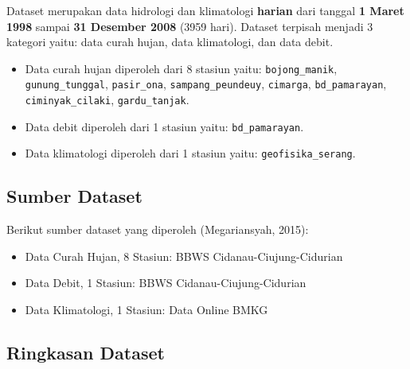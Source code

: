 \documentclass[11pt]{article}
\providecommand{\tightlist}{%
      \setlength{\itemsep}{0pt}\setlength{\parskip}{0pt}}
\begin{document}
Dataset merupakan data hidrologi dan klimatologi \textbf{harian} dari
tanggal \textbf{1 Maret 1998} sampai \textbf{31 Desember 2008} (3959
hari). Dataset terpisah menjadi 3 kategori yaitu: data curah hujan, data
klimatologi, dan data debit.

\begin{itemize}
\tightlist
\item
  Data curah hujan diperoleh dari 8 stasiun yaitu:
  \texttt{bojong\_manik}, \texttt{gunung\_tunggal}, \texttt{pasir\_ona},
  \texttt{sampang\_peundeuy}, \texttt{cimarga}, \texttt{bd\_pamarayan},
  \texttt{ciminyak\_cilaki}, \texttt{gardu\_tanjak}.
\item
  Data debit diperoleh dari 1 stasiun yaitu: \texttt{bd\_pamarayan}.
\item
  Data klimatologi diperoleh dari 1 stasiun yaitu:
  \texttt{geofisika\_serang}.
\end{itemize}

    \hypertarget{sumber-dataset}{%
\subsection{Sumber Dataset}\label{sumber-dataset}}

Berikut sumber dataset yang diperoleh (Megariansyah, 2015):

\begin{itemize}
\tightlist
\item
  Data Curah Hujan, 8 Stasiun: BBWS Cidanau-Ciujung-Cidurian
\item
  Data Debit, 1 Stasiun: BBWS Cidanau-Ciujung-Cidurian
\item
  Data Klimatologi, 1 Stasiun: Data Online BMKG
\end{itemize}

    \hypertarget{ringkasan-dataset}{%
\subsection{Ringkasan Dataset}\label{ringkasan-dataset}}
\end{document}
